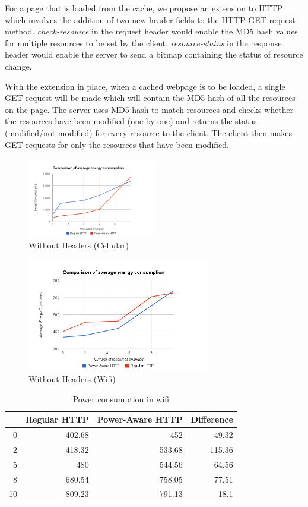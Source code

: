 \documentclass[9pt]{sigplan-proc-varsize}
\begin{document}
For a page that is loaded from the cache, we propose an extension to HTTP which involves the addition of two new header fields to the HTTP GET request method. {\it check-resource} in the request header would enable the MD5 hash values for multiple resources to be set by the client. {\it resource-status} in the response header would enable the server to send a bitmap containing the status of resource change.

With the extension in place, when a cached webpage is to be loaded, a single GET request will be made which will contain the MD5 hash of all the resources on the page. The server uses MD5 hash to match resources and checks whether the resources have been modified (one-by-one) and returns the status (modified/not modified) for every resource to the client. The client then makes GET requests for only the resources that have been modified.


\begin{figure}
  \centering
  \includegraphics[width=0.5\textwidth]
    {avg_energy_cell.png}%
  \caption{ Without Headers (Cellular)  }
\end{figure}

\begin{figure}[ht!]
\centering
\includegraphics[width=80mm]{avg_energy_wifi.png}
\caption{Without Headers (Wifi) }
\label{fig:sp_gd_mnist}
\end{figure}

\begin{table}[htbp]
\caption{Power consumption in wifi}
\begin{tabular}{|r|r|r|r|}
\hline
\multicolumn{1}{|l|}{} & \multicolumn{1}{l|}{Regular HTTP} & \multicolumn{1}{l|}{Power-Aware HTTP} & \multicolumn{1}{l|}{Difference} \\ \hline
0 & 402.68 & 452 & 49.32 \\ \hline
2 & 418.32 & 533.68 & 115.36 \\ \hline
5 & 480 & 544.56 & 64.56 \\ \hline
8 & 680.54 & 758.05 & 77.51 \\ \hline
10 & 809.23 & 791.13 & -18.1 \\ \hline
\end{tabular}
\label{}
\end{table}
\end{document}
